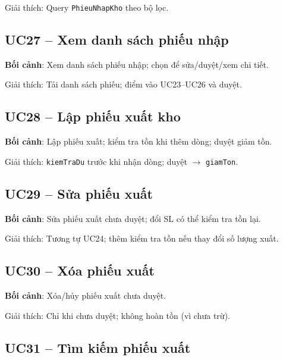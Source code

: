

Giải thích: Query \texttt{PhieuNhapKho} theo bộ lọc.

\subsection{UC27 -- Xem danh sách phiếu nhập}

\textbf{Bối cảnh}: Xem danh sách phiếu nhập; chọn để sửa/duyệt/xem chi tiết.



Giải thích: Tải danh sách phiếu; điểm vào UC23--UC26 và duyệt.

\subsection{UC28 -- Lập phiếu xuất kho}

\textbf{Bối cảnh}: Lập phiếu xuất; kiểm tra tồn khi thêm dòng; duyệt giảm tồn.



Giải thích: \texttt{kiemTraDu} trước khi nhận dòng; duyệt $\rightarrow$ \texttt{giamTon}.

\subsection{UC29 -- Sửa phiếu xuất}

\textbf{Bối cảnh}: Sửa phiếu xuất chưa duyệt; đổi SL có thể kiểm tra tồn lại.



Giải thích: Tương tự UC24; thêm kiểm tra tồn nếu thay đổi số lượng xuất.

\subsection{UC30 -- Xóa phiếu xuất}

\textbf{Bối cảnh}: Xóa/hủy phiếu xuất chưa duyệt.



Giải thích: Chỉ khi chưa duyệt; không hoàn tồn (vì chưa trừ).

\subsection{UC31 -- Tìm kiếm phiếu xuất}

